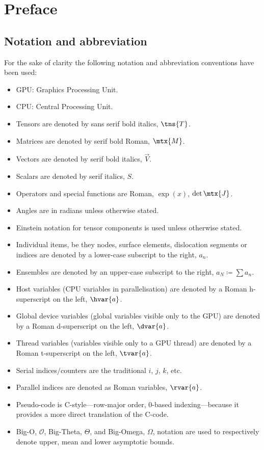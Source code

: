 \addtocounter{chapter}{-1}
\chapter{Preface}
\label{c:pre}

\section{Notation and abbreviation}
\label{s:nota}

For the sake of clarity the following notation and abbreviation conventions have been used:
\begin{itemize}
	\item GPU: Graphics Processing Unit.
	\item CPU: Central Processing Unit.
	\item Tensors are denoted by sans serif bold italics, $ \tns{T} $.
	\item Matrices are denoted by serif bold Roman, $ \mtx{M} $.
	\item Vectors are denoted by serif bold italics, $ \vec{V} $.
	\item Scalars are denoted by serif italics, $ S $.
	\item Operators and special functions are Roman, $\exp(x)$, $\det{\mtx{J}}$.
	\item Angles are in radians unless otherwise stated.
	\item Einstein notation for tensor components is used unless otherwise stated.
	\item Individual items, be they nodes, surface elements, dislocation segments or indices are denoted by a lower-case subscript to the right, $a_n$.
	\item Ensembles are denoted by an upper-case subscript to the right, $a_N \coloneqq \sum a_n$.
	\item Host variables (CPU variables in parallelisation) are denoted by a Roman h-superscript on the left, $\hvar{a}$.
	\item Global device variables (global variables visible only to the GPU) are denoted by a Roman d-superscript on the left, $\dvar{a}$.
	\item Thread variables (variables visible only to a GPU thread) are denoted by a Roman t-superscript on the left, $\tvar{a}$.
	\item Serial indices/counters are the traditional $i$, $j$, $k$, etc.
	\item Parallel indices are denoted as Roman variables, $\rvar{a}$.
	\item Pseudo-code is C-style---row-major order, 0-based indexing---because it provides a more direct translation of the C-code.
	\item Big-O, $\mathcal{O}$, Big-Theta, $\Theta$, and Big-Omega, $\Omega$, notation are used to respectively denote upper, mean and lower asymptotic bounds.
\end{itemize}

